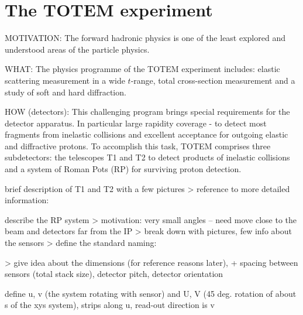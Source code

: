 \iffalse
TOTEM, RP, T1, T2, IP, BPM, BLM
\fi

\chapter{The TOTEM experiment}

MOTIVATION: The forward hadronic physics is one of the least explored and understood areas of the particle physics.

WHAT: The physics programme of the TOTEM experiment includes:
\> elastic scattering measurement in a wide $t$-range,
\> total cross-section measurement and
\> a study of soft and hard diffraction.


HOW (detectors): This challenging program brings special requirements for the detector apparatus. In particular large rapidity coverage - to detect most fragments from inelastic collisions and excellent acceptance for outgoing elastic and diffractive protons. To accomplish this task, TOTEM comprises three subdetectors: the telescopes T1 and T2 to detect products of inelastic collisions and a system of Roman Pots (RP) for surviving proton detection.


\> brief description of T1 and T2 with a few pictures
\>> reference to more detailed information: 

\> describe the RP system
\>> motivation: very small angles -- need move close to the beam and detectors far from the IP
\>> break down with pictures, few info about the sensors
\>> define the standard naming: 


\>> give idea about the dimensions (for reference reasons later), + spacing between sensors (total stack size), detector pitch, detector orientation

\> define u, v (the system rotating with sensor) and U, V (45 deg. rotation of about s of the xys system), strips along u, read-out direction is v


